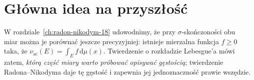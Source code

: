 \section{Główna idea na przyszłość}
W rozdziale~\ref{ch:radon-nikodym-18} udowodnimy, że przy
$\sigma$-skończoności obu miar można je porównać
jeszcze precyzyjniej: istnieje mierzalna funkcja
$f\ge0$ taka, że
$\nu_{\mathrm{ac}}(E)=\int_E f\,\mathrm d\mu(x)$.
Twierdzenie o rozkładzie Lebesgue'a mówi zatem,
\emph{którą część miary warto próbować opisywać gęstością};
twierdzenie Radona--Nikodyma daje tę gęstość i
zapewnia jej jednoznaczność prawie wszędzie.
